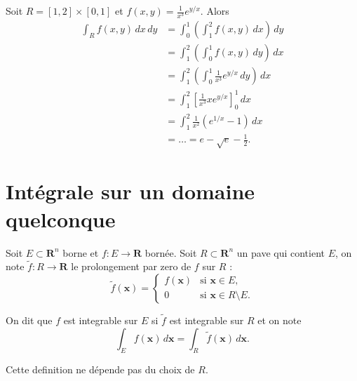 \begin{example}
Soit $R=[1,2]\times[0,1]$ et $f(x,y)=\frac{1}{x^{3}}e^{ y/x }$. Alors
\begin{align*}
\int _{R}f(x,y)\,dx\,dy & =\int _{0}^{1}\left( \int_{1}^{2} f(x,y) \, dx  \right)\,dy  \\
 & =\int_{1}^{2} \left( \int_{0}^{1} f(x,y) \, dy  \right) \, dx  \\
 & =\int_{1}^{2} \left( \int_{0}^{1} \frac{1}{x^{3}}e^{ y/x } \, dy  \right) \, dx \\
  & =\int_{1}^{2} \left[ \frac{1}{x^{3}} xe^{ y/x } \right]_{0}^{1} \, dx \\
  & =\int_{1}^{2} \frac{1}{x^{2}}(e^{ 1/x }-1) \, dx\\
  &= \dots = e-\sqrt{ e }-\frac{1}{2}.
\end{align*}
\end{example}
\section{Intégrale sur un domaine quelconque}

Soit $E\subset \mathbf{R}^{n}$ borne et $f:E\to \mathbf{R}$ bornée. Soit $R\subset \mathbf{R}^{n}$ un pave qui contient $E$, on note $\tilde{f}:R\to \mathbf{R}$ le prolongement par zero de $f$ sur $R$ :
$$
\tilde{f}(\boldsymbol{x})=\begin{cases}
f(\boldsymbol{x}) & \text{si }\boldsymbol{x}\in E ,\\
0 & \text{si }\boldsymbol{x}\in R\setminus E.
\end{cases}
$$
\begin{definition}
On dit que $f$ est integrable sur $E$ si $\tilde{f}$ est integrable sur $R$ et on note 
$$
\int _{E}f(\boldsymbol{x})\,d\boldsymbol{x}=\int _{R}\tilde{f}(\boldsymbol{x})\,d\boldsymbol{x}.
$$
\end{definition}
\begin{remark}
Cette definition ne dépende pas du choix de $R$.
\end{remark}
